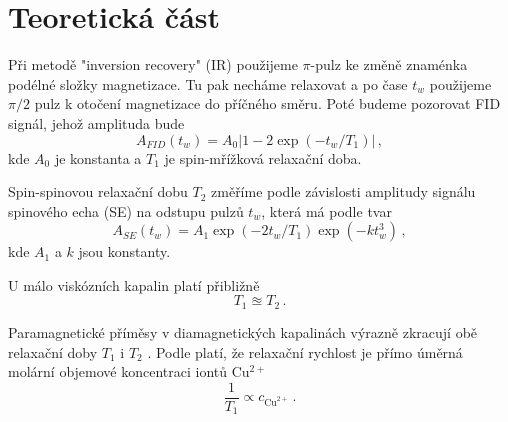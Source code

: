 \section*{Teoretická část}
Při metodě "inversion recovery" (IR) použijeme $\pi$-pulz ke změně znaménka podélné složky magnetizace. 
Tu pak necháme relaxovat a po čase $t_w$ použijeme $\pi/2$ pulz k otočení magnetizace do příčného směru.
Poté budeme pozorovat FID signál, jehož amplituda bude \cite{skripta}
\begin{equation} \label{e:IR}
A_{FID}(t_w)= A_0 | 1 - 2 \exp(-t_w/T_1)  | \,,
\end{equation}
kde $A_0$ je konstanta a $T_1$ je spin-mřížková relaxační doba.

Spin-spinovou relaxační dobu $T_2$ změříme podle závislosti amplitudy signálu spinového echa (SE) na odstupu pulzů $t_w$, která má podle \cite{skripta} tvar
\begin{equation} \label{e:SE}
A_{SE}(t_w)=A_1 \exp(-2t_w/T_1) \exp(-kt_w^3) \,,
\end{equation}
kde $A_1$ a $k$ jsou konstanty.

U málo viskózních kapalin platí přibližně \cite{skripta}
\begin{equation}
T_1 \approxeq T_2 \,.
\end{equation}

Paramagnetické příměsy v diamagnetických kapalinách výrazně zkracují obě relaxační doby $T_1$ i $T_2$ \cite{skripta}. Podle \cite{skripta} platí, že relaxační rychlost je přímo úměrná molární objemové koncentraci iontů Cu$^{2+}$
\begin{equation} \label{e:C}
\frac{1}{T_1} \propto c_{\text{Cu}^{2+}} \,.
\end{equation}